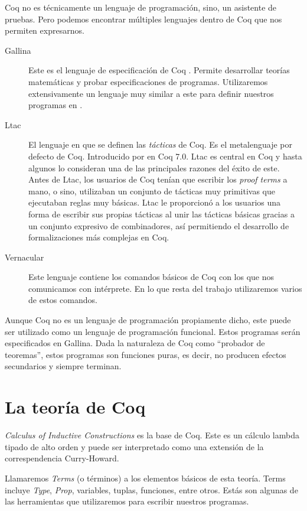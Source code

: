 Coq no es técnicamente un lenguaje de programación, sino, un asistente de pruebas. Pero podemos encontrar múltiples lenguajes dentro de Coq que nos permiten expresarnos. 
\begin{description}
    \item[Gallina] Este es el lenguaje de especificación de Coq \cite{Gallina}. Permite desarrollar teorías matemáticas y probar especificaciones de programas. Utilizaremos extensivamente un lenguaje muy similar a este para definir nuestros programas en \Mtac.
    \item[Ltac] El lenguaje en que se definen las \textit{tácticas} de Coq. Es el metalenguaje por defecto de Coq. Introducido por \citeauthor{DBLP:conf/lpar/Delahaye00} en Coq 7.0. Ltac \cite{DBLP:conf/lpar/Delahaye00} es central en Coq y hasta algunos lo consideran una de las principales razones del éxito de este. Antes de Ltac, los usuarios de Coq tenían que escribir los \textit{proof terms} a mano, o sino, utilizaban un conjunto de tácticas muy primitivas que ejecutaban reglas muy básicas. Ltac le proporcionó a los usuarios una forma de escribir sus propias tácticas al unir las tácticas básicas gracias a un conjunto expresivo de combinadores, así permitiendo el desarrollo de formalizaciones más complejas en Coq.
    \item[Vernacular] Este lenguaje contiene los comandos básicos de Coq con los que nos comunicamos con intérprete. En lo que resta del trabajo utilizaremos varios de estos comandos.
\end{description}

Aunque Coq no es un lenguaje de programación propiamente dicho, este puede ser utilizado como un lenguaje de programación funcional. Estos programas serán especificados en Gallina. Dada la naturaleza de Coq como ``probador de teoremas'', estos programas son funciones puras, es decir, no producen efectos secundarios y siempre terminan.

\section{La teoría de Coq}

\textit{Calculus of Inductive Constructions} \cite{CIC} es la base de Coq. Este es un cálculo lambda tipado de alto orden y puede ser interpretado como una extensión de la correspendencia Curry-Howard.

Llamaremos \textit{Terms} (o términos) a los elementos básicos de esta teoría. Terms incluye \textit{Type}, \textit{Prop}, variables, tuplas, funciones, entre otros. Estás son algunas de las herramientas que utilizaremos para escribir nuestros programas.

